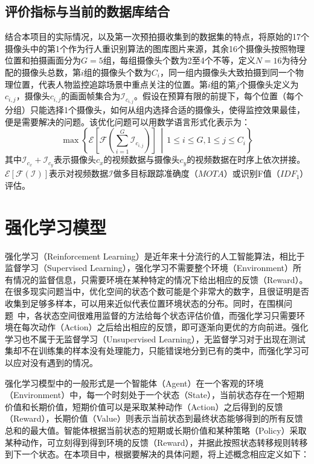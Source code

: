 \subsection{评价指标与当前的数据库结合}

结合本项目的实际情况，以及第一次预拍摄收集到的数据集的特点，将原始的17个摄像头中的第1个作为行人重识别算法的图库图片来源，其余16个摄像头按照物理位置和拍摄画面分为$G=5$组，每组摄像头个数为2至4个不等，定义$N=16$为待分配的摄像头总数，第$i$组的摄像头个数为$C_i$，同一组内摄像头大致拍摄到同一个物理位置，代表人物监控追踪场景中重点关注的位置。第$i$组的第$j$个摄像头定义为$c_{i,j}$，摄像头$c_{i,j}$的画面帧集合为$\mathcal{I}_{c_{i,j}}$。假设在预算有限的前提下，每个位置（每个分组）只能选择1个摄像头，如何从组内选择合适的摄像头，使得监控效果最佳，便是需要解决的问题。该优化问题可以用数学语言形式化表示为：
\begin{equation}
\max \left\{\mathcal{E}\left[\mathcal{F}\left(\sum_{i=1}^G \mathcal{I}_{c_{i,j}}\right)\right]\,\middle\vert\, 1\leq i \leq G, 1\leq j \leq C_i\right\}
\end{equation}
其中$\mathcal{I}_{c_x}+\mathcal{I}_{c_y}$表示摄像头$c_x$的视频数据与摄像头$c_y$的视频数据在时序上依次拼接。$\mathcal{E}[\mathcal{F}(\mathcal{I})]$表示对视频数据$\mathcal{I}$做多目标跟踪准确度（$\mathit{MOTA}$）或识别F值（$\mathit{IDF_1}$）评估。

\section{强化学习模型}

强化学习（Reinforcement Learning）是近年来十分流行的人工智能算法，相比于监督学习（Supervised Learning），强化学习不需要整个环境（Environment）所有情况的监督信息，只需要环境在某种特定的情况下给出相应的反馈（Reward）。在很多现实问题当中，优化空间的状态个数可能是个非常大的数字，且很证明是否收集到足够多样本，可以用来近似代表位置环境状态的分布。同时，在围棋问题~\cite{silver2016mastering}中，各状态空间很难用监督的方法给每个状态评估价值，而强化学习只需要环境在每次动作（Action）之后给出相应的反馈，即可逐渐向更优的方向前进。强化学习也不属于无监督学习（Unsupervised Learning），无监督学习对于出现在测试集却不在训练集的样本没有处理能力，只能错误地分到已有的类中，而强化学习可以应对没有遇到的情况。

强化学习模型中的一般形式是一个智能体（Agent）在一个客观的环境（Environment）中，每一个时刻处于一个状态（State），当前状态存在一个短期价值和长期价值，短期价值可以是采取某种动作（Action）之后得到的反馈（Reward），长期价值（Value）则表示当前状态到最终状态能够得到的所有反馈总和的最大值。智能体根据当前状态的短期或长期价值和某种策略（Policy）采取某种动作，可立刻得到得到环境的反馈（Reward），并据此按照状态转移规则转移到下一个状态。在本项目中，根据要解决的具体问题，将上述概念相应定义如下：

